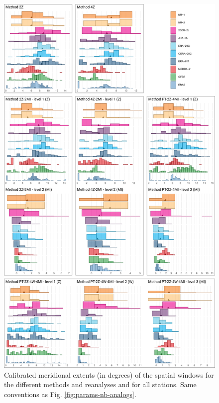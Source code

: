 \documentclass[alpha-refs]{wiley-article}
\begin{document}
\begin{figure}[btp]
	\centering
	\includegraphics[width=115mm]{figure-8.pdf}
	\caption{Calibrated meridional extents (in degrees) of the spatial windows for the different methods and reanalyses and for all stations. Same conventions as Fig. \protect\ref{fig:params-nb-analogs}.}
	\label{fig:params-ywidth}
\end{figure}
\end{document}
